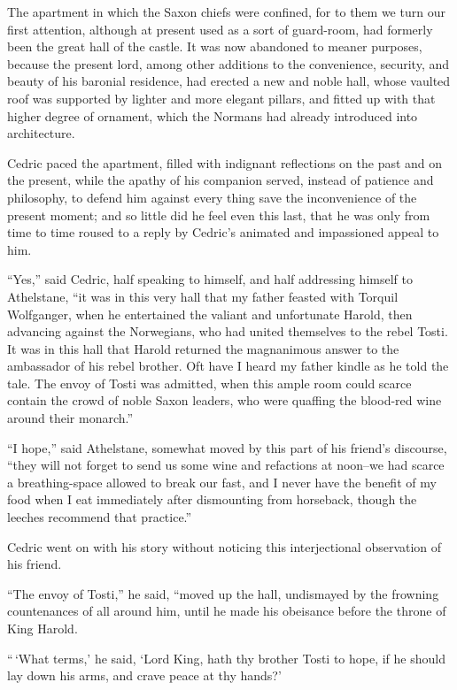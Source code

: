 The apartment in which the Saxon chiefs were confined, for to them we
turn our first attention, although at present used as a sort of
guard-room, had formerly been the great hall of the castle. It was now
abandoned to meaner purposes, because the present lord, among other
additions to the convenience, security, and beauty of his baronial
residence, had erected a new and noble hall, whose vaulted roof was
supported by lighter and more elegant pillars, and fitted up with that
higher degree of ornament, which the Normans had already introduced into
architecture.

Cedric paced the apartment, filled with indignant reflections on the
past and on the present, while the apathy of his companion served,
instead of patience and philosophy, to defend him against every thing
save the inconvenience of the present moment; and so little did he feel
even this last, that he was only from time to time roused to a reply by
Cedric's animated and impassioned appeal to him.

``Yes,'' said Cedric, half speaking to himself, and half addressing
himself to Athelstane, ``it was in this very hall that my father feasted
with Torquil Wolfganger, when he entertained the valiant and unfortunate
Harold, then advancing against the Norwegians, who had united themselves
to the rebel Tosti. It was in this hall that Harold returned the
magnanimous answer to the ambassador of his rebel brother. Oft have I
heard my father kindle as he told the tale. The envoy of Tosti was
admitted, when this ample room could scarce contain the crowd of noble
Saxon leaders, who were quaffing the blood-red wine around their
monarch.''

``I hope,'' said Athelstane, somewhat moved by this part of his friend's
discourse, ``they will not forget to send us some wine and refactions at
noon--we had scarce a breathing-space allowed to break our fast, and I
never have the benefit of my food when I eat immediately after
dismounting from horseback, though the leeches recommend that
practice.''

Cedric went on with his story without noticing this interjectional
observation of his friend.

``The envoy of Tosti,'' he said, ``moved up the hall, undismayed by the
frowning countenances of all around him, until he made his obeisance
before the throne of King Harold.

``\,`What terms,' he said, `Lord King, hath thy brother Tosti to hope, if
he should lay down his arms, and crave peace at thy hands?'

